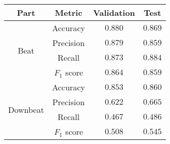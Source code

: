 \begin{tabular}{cc|cc}
    \textbf{Part}             & \textbf{Metric} & \textbf{Validation} & \textbf{Test} \\\hline
    \multirow{4}{*}{Beat}     & Accuracy        & $0.880$             & $0.869$       \\
                              & Precision       & $0.879$             & $0.859$       \\
                              & Recall          & $0.873$             & $0.884$       \\
                              & $F_1$ score     & $0.864$             & $0.859$       \\\hline
    \multirow{4}{*}{Downbeat} & Accuracy        & $0.853$             & $0.860$       \\
                              & Precision       & $0.622$             & $0.665$       \\
                              & Recall          & $0.467$             & $0.486$       \\
                              & $F_1$ score     & $0.508$             & $0.545$
\end{tabular}
